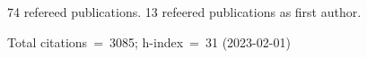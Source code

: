 74 refereed publications. 13 refeered publications as first author.

Total citations~=~3085; h-index~=~31 (2023-02-01)
